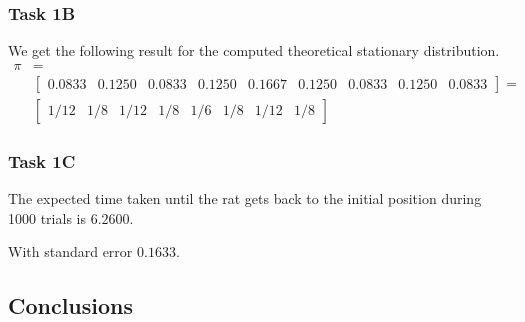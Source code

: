 \subsubsection{Task 1B}

We get the following result for the computed theoretical stationary distribution.
\begin{align*}
\pi & =  \\ 
 & \begin{bmatrix}
0.0833 &    0.1250 &    0.0833 &    0.1250 &    0.1667 &    0.1250 &    0.0833  &   0.1250 &    0.0833 
\end{bmatrix} = \\
 & \begin{bmatrix}
1/12   &        1/8  &         1/12  &        1/8         &  1/6         &  1/8          & 1/12         & 1/8    
\end{bmatrix}
\end{align*}

\subsubsection{Task 1C}

The expected time taken until the rat gets back to the initial position during 1000 trials is $6.2600$.

With standard error $0.1633$.




\subsection{Conclusions}
\label{sec:conc1}

